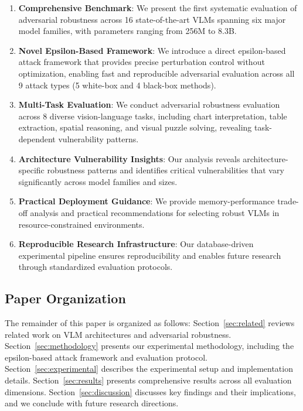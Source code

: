\begin{enumerate}
    \item \textbf{Comprehensive Benchmark}: We present the first systematic evaluation of adversarial robustness across 16 state-of-the-art VLMs spanning six major model families, with parameters ranging from 256M to 8.3B.

    \item \textbf{Novel Epsilon-Based Framework}: We introduce a direct epsilon-based attack framework that provides precise perturbation control without optimization, enabling fast and reproducible adversarial evaluation across all 9 attack types (5 white-box and 4 black-box methods).

    \item \textbf{Multi-Task Evaluation}: We conduct adversarial robustness evaluation across 8 diverse vision-language tasks, including chart interpretation, table extraction, spatial reasoning, and visual puzzle solving, revealing task-dependent vulnerability patterns.

    \item \textbf{Architecture Vulnerability Insights}: Our analysis reveals architecture-specific robustness patterns and identifies critical vulnerabilities that vary significantly across model families and sizes.

    \item \textbf{Practical Deployment Guidance}: We provide memory-performance trade-off analysis and practical recommendations for selecting robust VLMs in resource-constrained environments.

    \item \textbf{Reproducible Research Infrastructure}: Our database-driven experimental pipeline ensures reproducibility and enables future research through standardized evaluation protocols.
\end{enumerate}

\subsection{Paper Organization}

The remainder of this paper is organized as follows: Section~\ref{sec:related} reviews related work on VLM architectures and adversarial robustness. Section~\ref{sec:methodology} presents our experimental methodology, including the epsilon-based attack framework and evaluation protocol. Section~\ref{sec:experimental} describes the experimental setup and implementation details. Section~\ref{sec:results} presents comprehensive results across all evaluation dimensions. Section~\ref{sec:discussion} discusses key findings and their implications, and we conclude with future research directions.